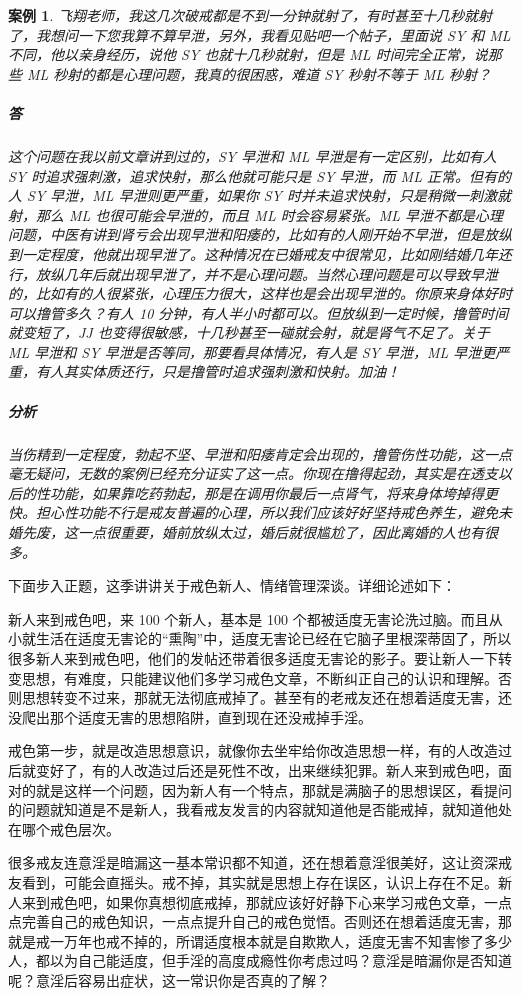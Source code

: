 \documentclass[fontset=founder]{ctexart}
\newtheorem{case}{案例}
\begin{document}
\begin{case}
    飞翔老师，我这几次破戒都是不到一分钟就射了，有时甚至十几秒就射了，我想问一下您我算不算早泄，另外，我看见贴吧一个帖子，里面说 SY 和 ML 不同，他以亲身经历，说他 SY 也就十几秒就射，但是 ML 时间完全正常，说那些 ML 秒射的都是心理问题，我真的很困惑，难道 SY 秒射不等于 ML 秒射？
    \subparagraph{答} 这个问题在我以前文章讲到过的，SY 早泄和 ML 早泄是有一定区别，比如有人 SY 时追求强刺激，追求快射，那么他就可能只是 SY 早泄，而 ML 正常。但有的人 SY 早泄，ML 早泄则更严重，如果你 SY 时并未追求快射，只是稍微一刺激就射，那么 ML 也很可能会早泄的，而且 ML 时会容易紧张。ML 早泄不都是心理问题，中医有讲到肾亏会出现早泄和阳痿的，比如有的人刚开始不早泄，但是放纵到一定程度，他就出现早泄了。这种情况在已婚戒友中很常见，比如刚结婚几年还行，放纵几年后就出现早泄了，并不是心理问题。当然心理问题是可以导致早泄的，比如有的人很紧张，心理压力很大，这样也是会出现早泄的。你原来身体好时可以撸管多久？有人 10 分钟，有人半小时都可以。但放纵到一定时候，撸管时间就变短了，JJ 也变得很敏感，十几秒甚至一碰就会射，就是肾气不足了。关于 ML 早泄和 SY 早泄是否等同，那要看具体情况，有人是 SY 早泄，ML 早泄更严重，有人其实体质还行，只是撸管时追求强刺激和快射。加油！
    \subparagraph{分析} 当伤精到一定程度，勃起不坚、早泄和阳痿肯定会出现的，撸管伤性功能，这一点毫无疑问，无数的案例已经充分证实了这一点。你现在撸得起劲，其实是在透支以后的性功能，如果靠吃药勃起，那是在调用你最后一点肾气，将来身体垮掉得更快。担心性功能不行是戒友普遍的心理，所以我们应该好好坚持戒色养生，避免未婚先废，这一点很重要，婚前放纵太过，婚后就很尴尬了，因此离婚的人也有很多。
\end{case}

下面步入正题，这季讲讲关于戒色新人、情绪管理深谈。详细论述如下：

新人来到戒色吧，来 100 个新人，基本是 100 个都被适度无害论洗过脑。而且从小就生活在适度无害论的“熏陶”中，适度无害论已经在它脑子里根深蒂固了，所以很多新人来到戒色吧，他们的发帖还带着很多适度无害论的影子。要让新人一下转变思想，有难度，只能建议他们多学习戒色文章，不断纠正自己的认识和理解。否则思想转变不过来，那就无法彻底戒掉了。甚至有的老戒友还在想着适度无害，还没爬出那个适度无害的思想陷阱，直到现在还没戒掉手淫。

戒色第一步，就是改造思想意识，就像你去坐牢给你改造思想一样，有的人改造过后就变好了，有的人改造过后还是死性不改，出来继续犯罪。新人来到戒色吧，面对的就是这样一个问题，因为新人有一个特点，那就是满脑子的思想误区，看提问的问题就知道是不是新人，我看戒友发言的内容就知道他是否能戒掉，就知道他处在哪个戒色层次。

很多戒友连意淫是暗漏这一基本常识都不知道，还在想着意淫很美好，这让资深戒友看到，可能会直摇头。戒不掉，其实就是思想上存在误区，认识上存在不足。新人来到戒色吧，如果你真想彻底戒掉，那就应该好好静下心来学习戒色文章，一点点完善自己的戒色知识，一点点提升自己的戒色觉悟。否则还在想着适度无害，那就是戒一万年也戒不掉的，所谓适度根本就是自欺欺人，适度无害不知害惨了多少人，都以为自己能适度，但手淫的高度成瘾性你考虑过吗？意淫是暗漏你是否知道呢？意淫后容易出症状，这一常识你是否真的了解？
\end{document}
